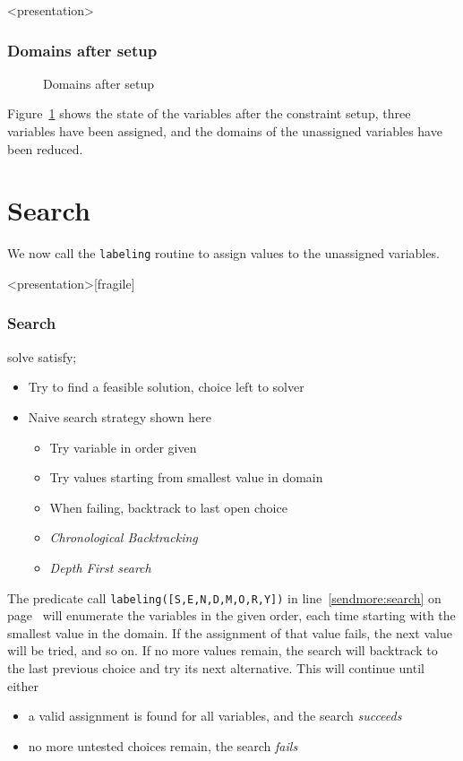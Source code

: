 \begin{frame}<presentation>
\frametitle{Domains after setup}
\begin{center}

\end{center}
\end{frame}

\begin{figure}[ht]
\caption{\label{sendmore:aftersetup}Domains after setup}
\begin{center}

\end{center}
\end{figure}


Figure~\ref{sendmore:aftersetup} shows the state of the variables after the constraint setup, three variables have been assigned, and the domains of the unassigned variables have been reduced.

\clearpage
\section{Search}

We now call the \texttt{labeling} routine to assign values to the unassigned variables.

\begin{frame}<presentation>[fragile]
\frametitle{Search}
solve satisfy;
\begin{itemize}
\item Try to find a feasible solution, choice left to solver
  \item Naive search strategy shown here
\begin{itemize}  
\item Try variable in order given
\item Try values starting from smallest value in domain
\item When failing, backtrack to last open choice
\item {\em Chronological Backtracking}
\item {\em Depth First search}
\end{itemize}
\end{itemize}
\end{frame}

The predicate call
\texttt{labeling([S,E,N,D,M,O,R,Y])}
in line~\ref{sendmore:search} on page~\pageref{sendmore:search} will enumerate the variables in the given order, each time starting with the smallest value in the domain. If the assignment of that value fails, the next value will be tried, and so on. If no more values remain, the search will backtrack to the last previous choice and try its next alternative. This will continue until either
\begin{itemize}
\item a valid assignment is found for all variables, and the search {\em succeeds}
\item no more untested choices remain, the search {\em fails}
\end{itemize}


